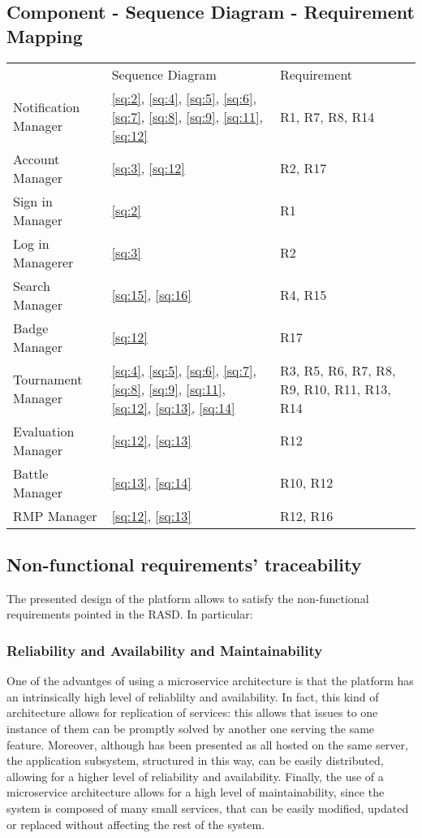\subsection{Component - Sequence Diagram - Requirement Mapping} \label{uc:mapping}
\begin{center}
    \begin{tabu}{|X[.3]|X[.4]|X[.3]|} \hline \everyrow{\hline}
        & Sequence Diagram & Requirement \\
        Notification Manager & \ref{sq:2}, \ref{sq:4}, \ref{sq:5}, \ref{sq:6}, \ref{sq:7}, \ref{sq:8}, \ref{sq:9}, \ref{sq:11}, \ref{sq:12}  & R1, R7, R8, R14\\ 
        Account Manager & \ref{sq:3}, \ref{sq:12}  & R2, R17\\
        Sign in Manager & \ref{sq:2} & R1\\
        Log in Managerer & \ref{sq:3} & R2\\
        Search Manager & \ref{sq:15}, \ref{sq:16}& R4, R15\\
        Badge Manager & \ref{sq:12} & R17\\
        Tournament Manager & \ref{sq:4}, \ref{sq:5}, \ref{sq:6}, \ref{sq:7}, \ref{sq:8}, \ref{sq:9}, \ref{sq:11}, \ref{sq:12}, \ref{sq:13}, \ref{sq:14} & R3, R5, R6, R7, R8, R9, R10, R11, R13, R14\\
        Evaluation Manager & \ref{sq:12}, \ref{sq:13} & R12\\
        Battle Manager & \ref{sq:13}, \ref{sq:14} & R10, R12\\
        RMP Manager & \ref{sq:12}, \ref{sq:13} & R12, R16\\
    \end{tabu}
\end{center}

\subsection{Non-functional requirements' traceability}
The presented design of the platform allows to satisfy the non-functional requirements pointed in the RASD. In particular:
\subsubsection{Reliability and Availability and Maintainability}
One of the advantges of using a microservice architecture is that the platform has an intrinsically high level of reliablilty and availability. 
In fact, this kind of architecture allows for replication of services: this allows that issues to one instance of them can be promptly solved by another one serving the same feature. 
Moreover, although has been presented as all hosted on the same server, the application subsystem, structured in this way, can be easily distributed, allowing for a higher level of reliability and availability.
Finally, the use of a microservice architecture allows for a high level of maintainability, since the system is composed of many small services, that can be easily modified, updated or replaced without affecting the rest of the system.\\
